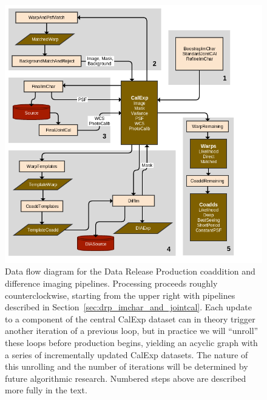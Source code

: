 \begin{figure}
\centering
\includegraphics[width=\textwidth]{figures/drp_coaddition_and_diffim.png}
\caption{
  Data flow diagram for the Data Release Production coaddition and difference imaging pipelines.  Processing proceeds roughly counterclockwise, starting from the upper right with pipelines described in Section~\ref{sec:drp_imchar_and_jointcal}.  Each update to a component of the central CalExp dataset can in theory trigger another iteration of a previous loop, but in practice we will ``unroll'' these loops before production begins, yielding an acyclic graph with a series of incrementally updated CalExp datasets.  The nature of this unrolling and the number of iterations will be determined by future algorithmic research.  Numbered steps above are described more fully in the text.
  \label{fig:drp_coaddition_and_diffim}
}
\end{figure}

